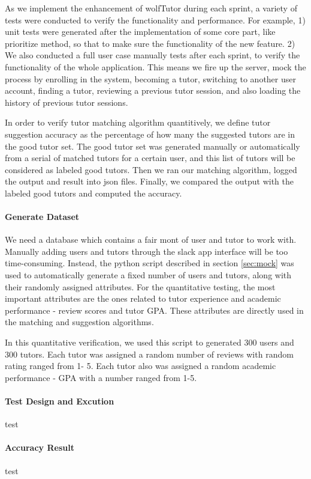 As we implement the enhancement of wolfTutor during each sprint, 
a variety of tests were conducted to verify the functionality and performance. 
For example, 1) unit tests were generated after the implementation of some 
core part, like prioritize method, so that to make sure the functionality of the 
new feature. 2) We also conducted a full user case manually tests after each 
sprint, to verify the functionality of the whole application. This means we fire 
up the server, mock the process by enrolling in the system,  becoming a tutor, 
switching to another user account, finding a tutor,  reviewing a previous tutor 
session, and also loading the history of previous tutor sessions.

In order to verify tutor matching algorithm quantitively, we define tutor 
suggestion accuracy as the percentage of how many the suggested tutors 
are in the good tutor set. The good tutor set was generated manually or 
automatically from a serial of matched tutors for a certain user, and this list 
of tutors will be considered as labeled good tutors. Then we ran our matching 
algorithm, logged the output and result into json files. Finally, we compared the 
output with the labeled good tutors and computed the accuracy.

\paragraph{Generate Dataset}
We need a database which contains a fair mont of user and tutor to work with. 
Manually adding users and tutors through the slack app interface will be too time-consuming. 
Instead, the python script described in section \ref{sec:mock} was used to automatically generate a fixed number of users and tutors, along with their randomly assigned attributes. For the quantitative testing, the most important attributes are the ones related to tutor experience and academic performance - review scores and tutor GPA. These attributes are directly used in the matching and suggestion algorithms.

In this quantitative verification, we used this script to generated 300 users and 300 tutors. Each tutor was assigned a random number of reviews with random rating ranged from 1- 5. Each tutor also was assigned a random academic performance - GPA with a number ranged from 1-5. 

\paragraph{Test Design and Excution} 
test

\paragraph{Accuracy Result} 
test

